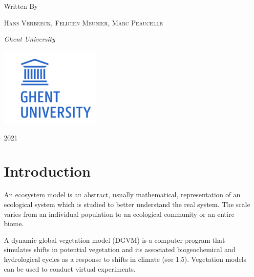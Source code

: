 \documentclass[
  12pt,
  oneside]{book}
\begin{document}
\begin{titlepage}
	Written By
	
	\vspace{0.5\baselineskip} %
	
	{\scshape Hans Verbeeck, Felicien Meunier, Marc Peaucelle \\} %
	
	\vspace{0.5\baselineskip} %
	
	\textit{Ghent University \\} %
	
	\vfill %
	
	
	
	\includegraphics[width = 50mm]{figures/UGhent2.png}
	
	\vspace{0.3\baselineskip} %
	
	2021 %
	

\end{titlepage}



{
\setcounter{tocdepth}{1}
\tableofcontents
}
\mainmatter

\hypertarget{intro}{%
\chapter{Introduction}\label{intro}}

An ecosystem model is an abstract, usually mathematical, representation of an ecological system which is studied to better understand the real system. The scale varies from an individual population to an ecological community or an entire biome.

A dynamic global vegetation model (DGVM) is a computer program that simulates shifts in potential vegetation and its associated biogeochemical and hydrological cycles as a response to shifts in climate (see 1.5). Vegetation models can be used to conduct virtual experiments.
\end{document}
